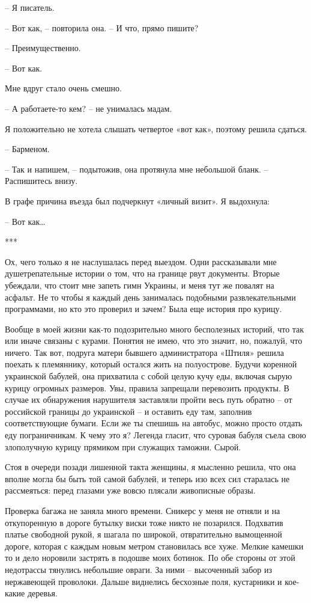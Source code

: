 \documentclass[
]{book}
\begin{document}
-- Я писатель.

-- Вот как, -- повторила она. -- И что, прямо пишите?

-- Преимущественно.

-- Вот как.

Мне вдруг стало очень смешно.

-- А работаете-то кем? -- не унималась мадам.

Я положительно не хотела слышать четвертое «вот как», поэтому решила сдаться.

-- Барменом.

-- Так и напишем, -- подытожив, она протянула мне небольшой бланк. -- Распишитесь внизу.

В графе причина въезда был подчеркнут «личный визит». Я выдохнула:

-- Вот как\ldots{}

***

Ох, чего только я не наслушалась перед выездом. Одни рассказывали мне душетрепательные истории о том, что на границе рвут документы. Вторые убеждали, что стоит мне запеть гимн Украины, и меня тут же повалят на асфальт. Не то чтобы я каждый день занималась подобными развлекательными программами, но кто это проверил и зачем? Была еще история про курицу.

Вообще в моей жизни как-то подозрительно много бесполезных историй, что так или иначе связаны с курами. Понятия не имею, что это значит, но, пожалуй, что ничего. Так вот, подруга матери бывшего администратора «Штиля» решила поехать к племяннику, который остался жить на полуострове. Будучи коренной украинской бабулей, она прихватила с собой целую кучу еды, включая сырую курицу огромных размеров. Увы, правила запрещали перевозить продукты. В случае их обнаружения нарушителя заставляли пройти весь путь обратно -- от российской границы до украинской -- и оставить еду там, заполнив соответствующие бумаги. Если же ты спешишь на автобус, можно просто отдать еду пограничникам. К чему это я? Легенда гласит, что суровая бабуля съела свою злополучную курицу прямиком при служащих таможни. Сырой.

Стоя в очереди позади лишенной такта женщины, я мысленно решила, что она вполне могла бы быть той самой бабулей, и теперь изо всех сил старалась не рассмеяться: перед глазами уже вовсю плясали живописные образы.

Проверка багажа не заняла много времени. Сникерс у меня не отняли и на откупоренную в дороге бутылку виски тоже никто не позарился. Подхватив платье свободной рукой, я шагала по широкой, отвратительно вымощенной дороге, которая с каждым новым метром становилась все хуже. Мелкие камешки то и дело норовили застрять в подошве моих ботинок. По обе стороны от этой недотрассы тянулись небольшие овраги. За ними -- высоченный забор из нержавеющей проволоки. Дальше виднелись бесхозные поля, кустарники и кое-какие деревья.
\end{document}
